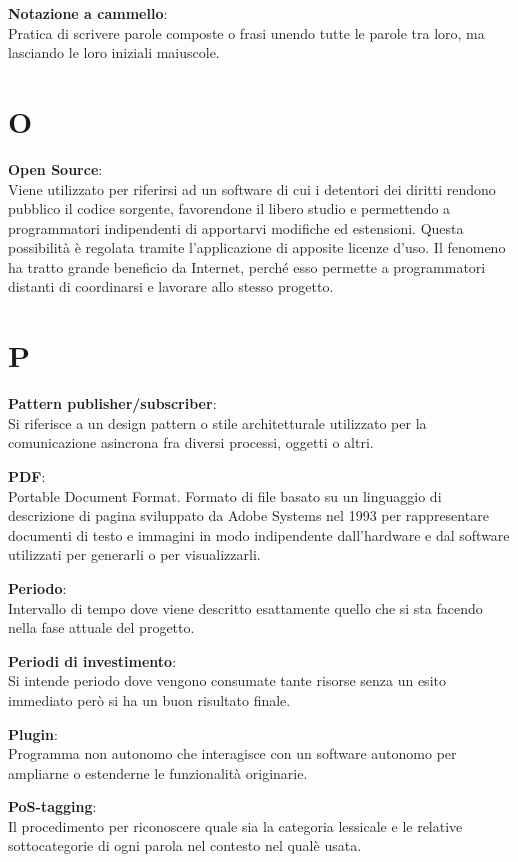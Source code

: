 \documentclass[a4paper, oneside, openany, dvipsnames, table]{article}
\begin{document}
\textbf{Notazione a cammello}:\\	Pratica di scrivere parole composte o frasi unendo tutte le parole tra loro, ma lasciando le loro iniziali maiuscole.

\newpage
\section{O}
\textbf{Open Source}:\\	Viene utilizzato per riferirsi ad un software di cui i detentori dei diritti rendono pubblico il codice sorgente, favorendone il libero studio e permettendo a programmatori indipendenti di apportarvi modifiche ed estensioni. Questa possibilità è regolata tramite l'applicazione di apposite licenze d'uso. Il fenomeno ha tratto grande beneficio da Internet, perché esso permette a programmatori distanti di coordinarsi e lavorare allo stesso progetto.

\newpage
\section{P}
\textbf{Pattern publisher/subscriber}:\\	 Si riferisce a un design pattern o stile architetturale utilizzato per la comunicazione asincrona fra diversi processi, oggetti o altri.

\textbf{PDF}:\\	Portable Document Format. Formato di file basato su un linguaggio di descrizione di pagina sviluppato da Adobe Systems nel 1993 per rappresentare documenti di testo e immagini in modo indipendente dall'hardware e dal software utilizzati per generarli o per visualizzarli.

\textbf{Periodo}:\\	Intervallo di tempo dove viene descritto esattamente quello che si sta facendo nella fase attuale del progetto.

\textbf{Periodi di investimento}:\\	Si intende periodo dove vengono consumate tante risorse senza un esito immediato però si ha un buon risultato finale.

\textbf{Plugin}:\\	Programma non autonomo che interagisce con un software autonomo per ampliarne o estenderne le funzionalità originarie.

\textbf{PoS-tagging}:\\	Il procedimento per riconoscere quale sia la categoria lessicale e le relative sottocategorie di ogni parola nel contesto nel qualè usata.
\end{document}
